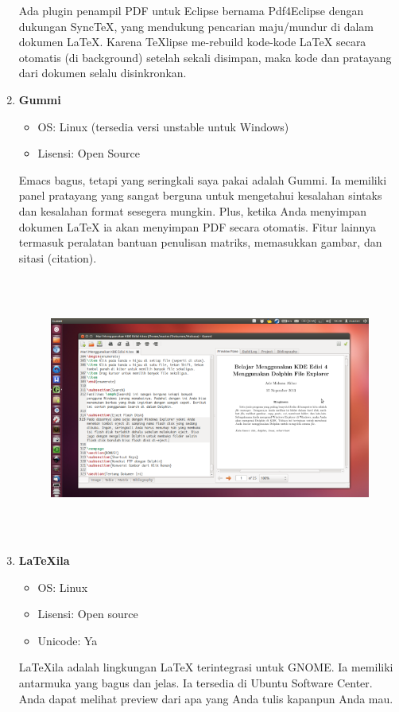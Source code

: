 \begin{enumerate}
Ada plugin penampil PDF untuk Eclipse bernama Pdf4Eclipse dengan dukungan SyncTeX, yang mendukung pencarian maju/mundur di dalam dokumen LaTeX. Karena TeXlipse me-rebuild kode-kode LaTeX secara otomatis (di background) setelah sekali disimpan, maka kode dan pratayang dari dokumen selalu disinkronkan.

\item \textbf{Gummi}
\begin{itemize}
\item OS: Linux (tersedia versi unstable untuk Windows)
\item Lisensi: Open Source
\end{itemize}


Emacs bagus, tetapi yang seringkali saya pakai adalah Gummi. Ia memiliki panel pratayang yang sangat berguna untuk mengetahui kesalahan sintaks dan kesalahan format sesegera mungkin. Plus, ketika Anda menyimpan dokumen LaTeX ia akan menyimpan PDF secara otomatis. Fitur lainnya termasuk peralatan bantuan penulisan matriks, memasukkan gambar, dan
sitasi (citation).
\par \vspace{12pt}

\begin{figure}[ht]

\includegraphics[width=15.45cm,height=8.68cm]{gambar/image10.jpg}
\end{figure}

\item \textbf{LaTeXila}
\begin{itemize}
\item OS: Linux
\item Lisensi: Open source
\item Unicode: Ya
\end{itemize}
\hspace{0,5in}LaTeXila adalah lingkungan LaTeX terintegrasi untuk GNOME. Ia memiliki antarmuka yang bagus dan jelas. Ia tersedia di Ubuntu Software Center. Anda dapat melihat preview dari apa yang Anda tulis kapanpun Anda mau.
\par \vspace{12pt}


\end{enumerate}
